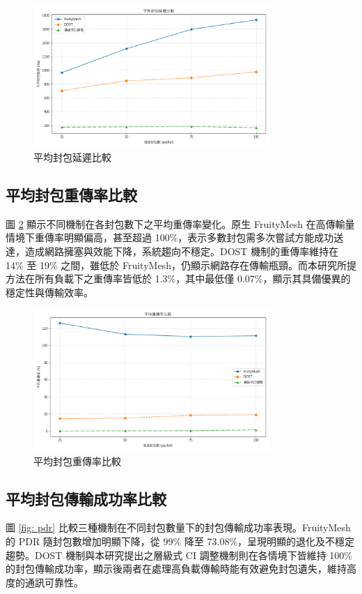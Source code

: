 \begin{ZhChapter}
\begin{figure}[H]
    \centering
    \includegraphics[width = 0.8\textwidth]{image/Avg_Packet_Delay_Comparison.png}
    \caption{平均封包延遲比較}
    \label{fig: avg_delay}
\end{figure}

\subsection{平均封包重傳率比較}
圖 \ref{fig: avg_retrans} 顯示不同機制在各封包數下之平均重傳率變化。原生 FruityMesh 在高傳輸量情境下重傳率明顯偏高，甚至超過 100\%，表示多數封包需多次嘗試方能成功送達，造成網路擁塞與效能下降，系統趨向不穩定。DOST 機制的重傳率維持在 14\% 至 19\% 之間，雖低於 FruityMesh，仍顯示網路存在傳輸瓶頸。而本研究所提方法在所有負載下之重傳率皆低於 1.3\%，其中最低僅 0.07\%，顯示其具備優異的穩定性與傳輸效率。

\begin{figure}[H]
    \centering
    \includegraphics[width = 0.8\textwidth]{image/Avg_Retransmission_Rate_Comparison.png}
    \caption{平均封包重傳率比較}
    \label{fig: avg_retrans}
\end{figure}

\subsection{平均封包傳輸成功率比較}
圖 \ref{fig: pdr} 比較三種機制在不同封包數量下的封包傳輸成功率表現。FruityMesh 的 PDR 隨封包數增加明顯下降，從 99\% 降至 73.08\%，呈現明顯的退化及不穩定趨勢。DOST 機制與本研究提出之層級式 CI 調整機制則在各情境下皆維持 100\% 的封包傳輸成功率，顯示後兩者在處理高負載傳輸時能有效避免封包遺失，維持高度的通訊可靠性。


\end{ZhChapter}
